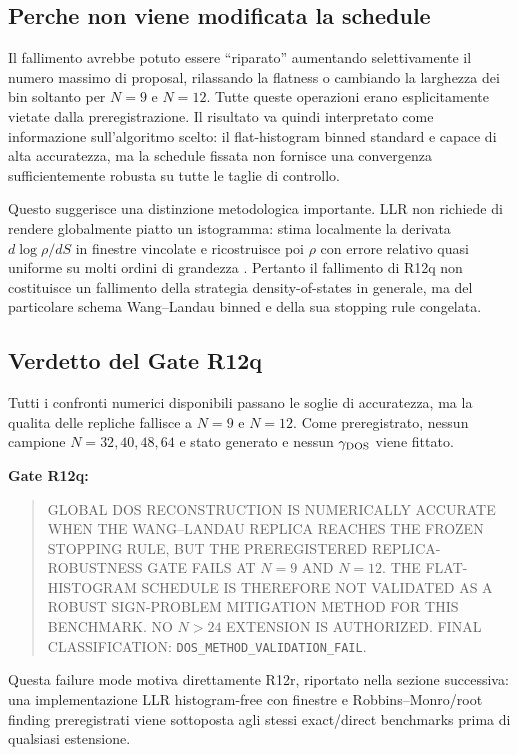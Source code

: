 \documentclass[11pt,a4paper]{article}
\newcommand{\status}[1]{\textsf{#1}}
\begin{document}
\subsection{Perche non viene modificata la schedule}

Il fallimento avrebbe potuto essere ``riparato'' aumentando selettivamente il numero massimo di proposal, rilassando la flatness o cambiando la larghezza dei bin soltanto per $N=9$ e $N=12$. Tutte queste operazioni erano esplicitamente vietate dalla preregistrazione. Il risultato va quindi interpretato come informazione sull'algoritmo scelto: il flat-histogram binned standard e capace di alta accuratezza, ma la schedule fissata non fornisce una convergenza sufficientemente robusta su tutte le taglie di controllo.

Questo suggerisce una distinzione metodologica importante. LLR non richiede di rendere globalmente piatto un istogramma: stima localmente la derivata $d\log\rho/dS$ in finestre vincolate e ricostruisce poi $\rho$ con errore relativo quasi uniforme su molti ordini di grandezza \cite{LangfeldEtAl2016}. Pertanto il fallimento di R12q non costituisce un fallimento della strategia density-of-states in generale, ma del particolare schema Wang--Landau binned e della sua stopping rule congelata.

\subsection{Verdetto del Gate R12q}

Tutti i confronti numerici disponibili passano le soglie di accuratezza, ma la qualita delle repliche fallisce a $N=9$ e $N=12$. Come preregistrato, nessun campione $N=32,40,48,64$ e stato generato e nessun $\gamma_{\rm DOS}$ viene fittato.

\textbf{Gate R12q:}
\begin{quote}
\status{GLOBAL DOS RECONSTRUCTION IS NUMERICALLY ACCURATE WHEN THE WANG--LANDAU REPLICA REACHES THE FROZEN STOPPING RULE, BUT THE PREREGISTERED REPLICA-ROBUSTNESS GATE FAILS AT $N=9$ AND $N=12$. THE FLAT-HISTOGRAM SCHEDULE IS THEREFORE NOT VALIDATED AS A ROBUST SIGN-PROBLEM MITIGATION METHOD FOR THIS BENCHMARK. NO $N>24$ EXTENSION IS AUTHORIZED. FINAL CLASSIFICATION:} \texttt{DOS\_METHOD\_VALIDATION\_FAIL}.
\end{quote}

Questa failure mode motiva direttamente R12r, riportato nella sezione successiva: una implementazione LLR histogram-free con finestre e Robbins--Monro/root finding preregistrati viene sottoposta agli stessi exact/direct benchmarks prima di qualsiasi estensione.
\end{document}
